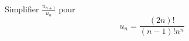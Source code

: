 Simplifier $\frac{u_{n+1}}{u_n}$ pour
\begin{displaymath}
 u_n=\frac{(2n)!}{(n-1)!n^n}
\end{displaymath}
\bigskip  \bigskip \bigskip